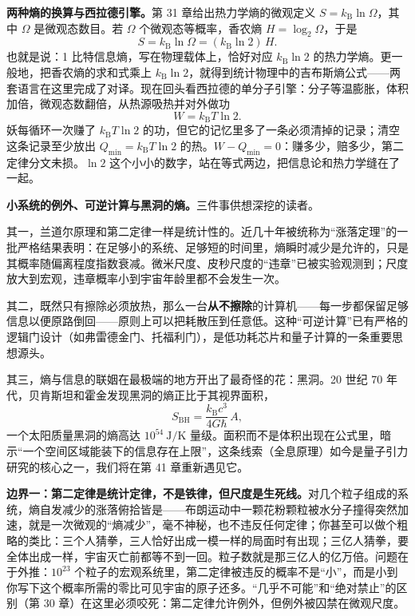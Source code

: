 \begin{mathbridge}
\textbf{两种熵的换算与西拉德引擎。}第 31 章给出热力学熵的微观定义 $S=k_{\mathrm{B}}\ln\Omega$，其中 $\Omega$ 是微观态数目。若 $\Omega$ 个微观态等概率，香农熵 $H=\log_2\Omega$，于是
\[
S=k_{\mathrm{B}}\ln\Omega=(k_{\mathrm{B}}\ln2)\,H.
\]
也就是说：1 比特信息熵，写在物理载体上，恰好对应 $k_{\mathrm{B}}\ln2$ 的热力学熵。更一般地，把香农熵的求和式乘上 $k_{\mathrm{B}}\ln2$，就得到统计物理中的吉布斯熵公式——两套语言在这里完成了对译。现在回头看西拉德的单分子引擎：分子等温膨胀，体积加倍，微观态数翻倍，从热源吸热并对外做功
\[
W=k_{\mathrm{B}}T\ln 2 .
\]
妖每循环一次赚了 $k_{\mathrm{B}}T\ln2$ 的功，但它的记忆里多了一条必须清掉的记录；清空这条记录至少放出 $Q_{\min}=k_{\mathrm{B}}T\ln2$ 的热。$W-Q_{\min}=0$：赚多少，赔多少，第二定律分文未损。$\ln2$ 这个小小的数字，站在等式两边，把信息论和热力学缝在了一起。
\end{mathbridge}

\begin{challenge}
\textbf{小系统的例外、可逆计算与黑洞的熵。}三件事供想深挖的读者。

其一，兰道尔原理和第二定律一样是统计性的。近几十年被统称为“涨落定理”的一批严格结果表明：在足够小的系统、足够短的时间里，熵瞬时减少是允许的，只是其概率随偏离程度指数衰减。微米尺度、皮秒尺度的“违章”已被实验观测到；尺度放大到宏观，违章概率小到宇宙年龄里都不会发生一次。

其二，既然只有擦除必须放热，那么一台\textbf{从不擦除}的计算机——每一步都保留足够信息以便原路倒回——原则上可以把耗散压到任意低。这种“可逆计算”已有严格的逻辑门设计（如弗雷德金门、托福利门），是低功耗芯片和量子计算的一条重要思想源头。

其三，熵与信息的联姻在最极端的地方开出了最奇怪的花：黑洞。20 世纪 70 年代，贝肯斯坦和霍金发现黑洞的熵正比于其视界面积，
\[
S_{\mathrm{BH}}=\frac{k_{\mathrm{B}}c^{3}}{4G\hbar}\,A,
\]
一个太阳质量黑洞的熵高达 $10^{54}\ \mathrm{J/K}$ 量级。面积而不是体积出现在公式里，暗示“一个空间区域能装下的信息存在上限”，这条线索（全息原理）如今是量子引力研究的核心之一，我们将在第 41 章重新遇见它。
\end{challenge}


\textbf{边界一：第二定律是统计定律，不是铁律，但尺度是生死线。}对几个粒子组成的系统，熵自发减少的涨落俯拾皆是——布朗运动中一颗花粉颗粒被水分子撞得突然加速，就是一次微观的“熵减少”，毫不神秘，也不违反任何定律；你甚至可以做个粗略的类比：三个人猜拳，三人恰好出成一模一样的局面时有出现；三亿人猜拳，要全体出成一样，宇宙灭亡前都等不到一回。粒子数就是那三亿人的亿万倍。问题在于外推：$10^{23}$ 个粒子的宏观系统里，第二定律被违反的概率不是“小”，而是小到你写下这个概率所需的零比可见宇宙的原子还多。“几乎不可能”和“绝对禁止”的区别（第 30 章）在这里必须咬死：第二定律允许例外，但例外被囚禁在微观尺度。

